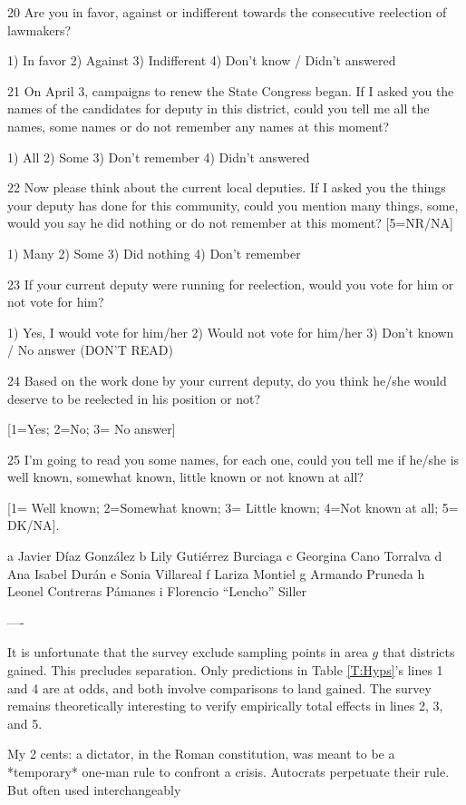 

20 Are you in favor, against or indifferent towards the consecutive reelection of lawmakers?

1) In favor 
2) Against
3) Indifferent
4) Don’t know / Didn’t answered

21 On April 3, campaigns to renew the State Congress began. If I asked you the names of the candidates for deputy in this district, could you tell me all the names, some names or do not remember any names at this moment?


1) All 
2) Some
3) Don’t remember
4) Didn’t answered

22 Now please think about the current local deputies. If I asked you the things your deputy has done for this community, could you mention many things, some, would you say he did nothing or do not remember at this moment? [5=NR/NA]

1) Many
2) Some
3) Did nothing
4) Don’t remember

23 If your current deputy were running for reelection, would you vote for him or not vote for him?

1) Yes, I would vote for him/her
2) Would not vote for him/her
3) Don’t known / No answer (DON’T READ)

24 Based on the work done by your current deputy, do you think he/she would deserve to be reelected in his position or not?

[1=Yes; 2=No; 3= No answer]

25 I’m going to read you some names, for each one, could you tell me if he/she is well known, somewhat known, little known or not known at all?

[1= Well known; 2=Somewhat known; 3= Little known; 4=Not known at all; 5= DK/NA].

a Javier Díaz González     
b Lily Gutiérrez Burciaga  
c Georgina Cano Torralva   
d Ana Isabel Durán         
e Sonia Villareal          
f Lariza Montiel           
g Armando Pruneda          
h Leonel Contreras Pámanes 
i Florencio ``Lencho'' Siller


----


It is unfortunate that the survey exclude sampling points in area $g$ that districts gained. This precludes separation. Only predictions in Table \ref{T:Hyps}'s lines 1 and 4 are at odds, and both involve comparisons to land gained. The survey remains theoretically interesting to verify empirically total effects in lines 2, 3, and 5. 

My 2 cents: a dictator, in the Roman constitution, was meant to be a *temporary* one-man rule to confront a crisis. Autocrats perpetuate their rule. But often used interchangeably  


